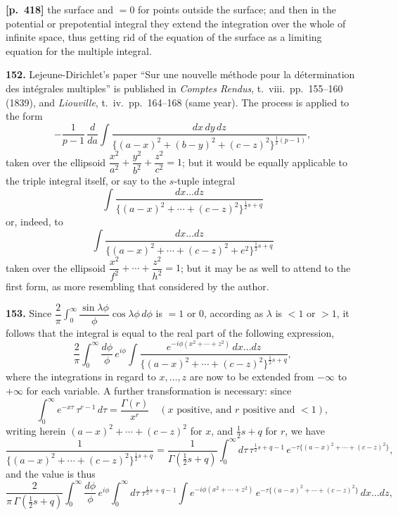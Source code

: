 \documentclass[11pt,a4paper]{article}
\begin{document}
\bigskip
\noindent\textbf{[p.~418]}\quad
the surface and $= 0$ for points outside the surface; and then in the potential or prepotential integral they extend the integration over the whole of infinite space, thus getting rid of the equation of the surface as a limiting equation for the multiple integral.

\textbf{152.} Lejeune-Dirichlet's paper ``Sur une nouvelle m\'ethode pour la d\'etermination des int\'egrales multiples'' is published in \textit{Comptes Rendus}, t.\ viii.\ pp.\ 155--160 (1839), and \textit{Liouville}, t.\ iv.\ pp.\ 164--168 (same year). The process is applied to the form
\[
-\frac{1}{p-1}\,\frac{d}{da}\int \frac{dx\,dy\,dz}{\{(a-x)^{2}+(b-y)^{2}+(c-z)^{2}\}^{\tfrac{1}{2}(p-1)}},
\]
taken over the ellipsoid $\dfrac{x^{2}}{a^{2}} + \dfrac{y^{2}}{b^{2}} + \dfrac{z^{2}}{c^{2}} = 1$; but it would be equally applicable to the triple integral itself, or say to the $s$-tuple integral
\[
\int \frac{dx\ldots dz}{\{(a-x)^{2}+\cdots+(c-z)^{2}\}^{\tfrac{1}{2}s+q}}
\]
or, indeed, to
\[
\int \frac{dx\ldots dz}{\{(a-x)^{2}+\cdots+(c-z)^{2}+e^{2}\}^{\tfrac{1}{2}s+q}}
\]
taken over the ellipsoid $\dfrac{x^{2}}{f^{2}} + \cdots + \dfrac{z^{2}}{h^{2}} = 1$; but it may be as well to attend to the first form, as more resembling that considered by the author.

\textbf{153.} Since $\dfrac{2}{\pi}\int_{0}^{\infty} \dfrac{\sin\lambda\phi}{\phi}\cos\lambda\phi\,d\phi$ is $= 1$ or $0$, according as $\lambda$ is $< 1$ or $> 1$, it follows that the integral is equal to the real part of the following expression,
\[
\frac{2}{\pi}\int_{0}^{\infty}\frac{d\phi}{\phi}\,e^{i\phi}\int\frac{e^{-i\phi(x^{2}+\cdots+z^{2})}\,dx\ldots dz}{\{(a-x)^{2}+\cdots+(c-z)^{2}\}^{\tfrac{1}{2}s+q}},
\]
where the integrations in regard to $x,\ldots,z$ are now to be extended from $-\infty$ to $+\infty$ for each variable. A further transformation is necessary: since
\[
\int_{0}^{\infty} e^{-x\tau}\,\tau^{r-1}\,d\tau = \frac{\Gamma(r)}{x^{r}}\quad(x\text{ positive, and }r\text{ positive and }< 1),
\]
writing herein $(a-x)^{2}+\cdots+(c-z)^{2}$ for $x$, and $\tfrac{1}{2}s + q$ for $r$, we have
\[
\frac{1}{\{(a-x)^{2}+\cdots+(c-z)^{2}\}^{\tfrac{1}{2}s+q}} = \frac{1}{\Gamma(\tfrac{1}{2}s+q)}\int_{0}^{\infty} d\tau\,\tau^{\tfrac{1}{2}s+q-1}\,e^{-\tau\{(a-x)^{2}+\cdots+(c-z)^{2}\}},
\]
and the value is thus
\[
\frac{2}{\pi\,\Gamma(\tfrac{1}{2}s+q)}\int_{0}^{\infty} \frac{d\phi}{\phi}\,e^{i\phi}\int_{0}^{\infty} d\tau\,\tau^{\tfrac{1}{2}s+q-1}\int e^{-i\phi(x^{2}+\cdots+z^{2})}\,e^{-\tau\{(a-x)^{2}+\cdots+(c-z)^{2}\}}\,dx\ldots dz,
\]
\end{document}
